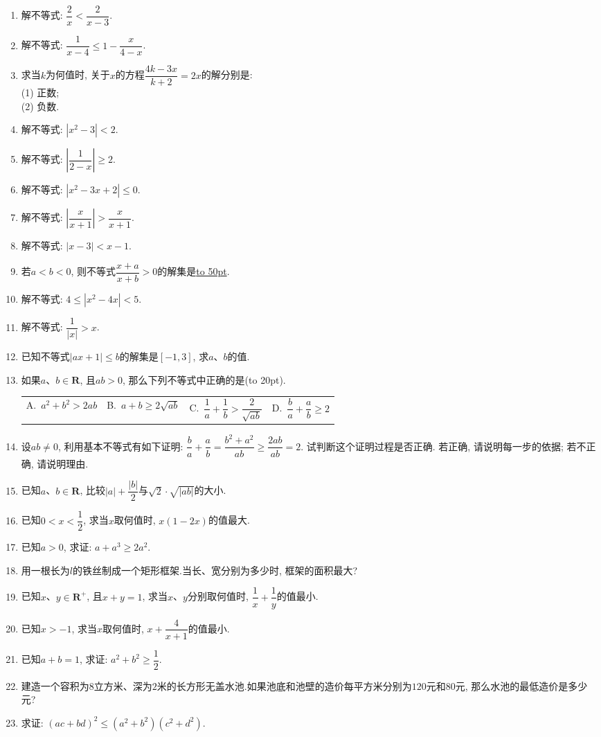 \documentclass[10pt,a4paper]{article}
\newcommand{\blank}[1]{\underline{\hbox to #1pt{}}}
\newcommand{\bracket}[1]{(\hbox to #1pt{})}
\newcommand{\fourch}[4]{\par\begin{tabular}{p{.23\textwidth}p{.23\textwidth}p{.23\textwidth}p{.23\textwidth}}
A.~#1 &B.~#2& C.~#3& D.~#4
\end{tabular}}
\begin{document}
\begin{enumerate}[1.]
\item 解不等式: $\dfrac 2x<\dfrac 2{x-3}$.
\item 解不等式: $\dfrac 1{x-4}\le 1-\dfrac x{4-x}$.
\item 求当$k$为何值时, 关于$x$的方程$\dfrac{4k-3x}{k+2}=2x$的解分别是:\\
(1) 正数;\\
(2) 负数.
\item 解不等式: $|x^2-3|<2$.
\item 解不等式: $|\dfrac 1{2-x}|\ge 2$.
\item 解不等式: $|x^2-3x+2|\le 0$.
\item 解不等式: $|\dfrac x{x+1}|>\dfrac x{x+1}$.
\item 解不等式: $|x-3|<x-1$.
\item 若$a<b<0$, 则不等式$\dfrac{x+a}{x+b}>0$的解集是\blank{50}.
\item 解不等式: $4\le|x^2-4x|<5$.
\item 解不等式: $\dfrac 1{|x|}>x$.
\item 已知不等式$|ax+1|\le b$的解集是$[-1,3]$, 求$a$、$b$的值.
\item 如果$a$、$b\in \mathbf{R}$, 且$ab>0$, 那么下列不等式中正确的是\bracket{20}.
\fourch{$a^2+b^2>2ab$}{$a+b\ge 2\sqrt {ab}$}{$\dfrac 1a+\dfrac 1b>\dfrac 2{\sqrt {ab}}$}{$\dfrac ba+\dfrac ab\ge 2$}
\item 设$ab\ne 0$, 利用基本不等式有如下证明: $\dfrac ba+\dfrac ab=\dfrac{{b^2}+{a^2}}{ab}\ge \dfrac{2ab}{ab}=2$. 试判断这个证明过程是否正确. 若正确, 请说明每一步的依据; 若不正确, 请说明理由.
\item 已知$a$、$b\in \mathbf{R}$, 比较$|a|+\dfrac{|b|}2$与$\sqrt 2\cdot \sqrt {|ab|}$的大小.
\item 已知$0<x<\dfrac 12$, 求当$x$取何值时, $x(1-2x)$的值最大.
\item 已知$a>0$, 求证: $a+a^3\ge 2a^2$.
\item 用一根长为$l$的铁丝制成一个矩形框架.当长、宽分别为多少时, 框架的面积最大?
\item 已知$x$、$y\in \mathbf{R}^+$, 且$x+y=1$, 求当$x$、$y$分别取何值时, $\dfrac 1x+\dfrac 1y$的值最小.
\item 已知$x>-1$, 求当$x$取何值时, $x+\dfrac 4{x+1}$的值最小.
\item 已知$a+b=1$, 求证: $a^2+b^2\ge \dfrac 12$.
\item 建造一个容积为$8$立方米、深为$2$米的长方形无盖水池.如果池底和池壁的造价每平方米分别为$120$元和$80$元, 那么水池的最低造价是多少元?
\item 求证: $(ac+bd)^2\le (a^2+b^2)(c^2+d^2)$.

\end{enumerate}
\end{document}

